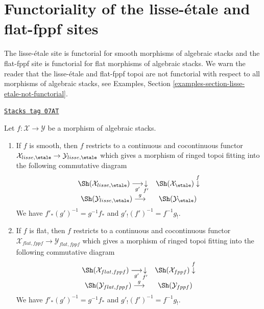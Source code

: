 \section{Functoriality of the lisse-\'etale and flat-fppf sites}
\label{stacks-cohomology-section-lisse-etale-functorial}
The lisse-\'etale site is functorial for smooth morphisms of algebraic stacks
and the flat-fppf site is functorial for flat morphisms of algebraic stacks.
We warn the reader that the lisse-\'etale and flat-fppf topoi are not
functorial with respect to all morphisms of algebraic stacks, see
Examples, Section \ref{examples-section-lisse-etale-not-functorial}.

\begin{lemma}
\label{stacks-cohomology-lemma-lisse-etale-functorial}
\href{https://stacks.math.columbia.edu/tag/07AT}{\texttt{Stacks tag 07AT}}

Let $f : \mathcal{X} \to \mathcal{Y}$ be a morphism of algebraic stacks.
\begin{enumerate}
\item If $f$ is smooth, then $f$ restricts to a continuous and cocontinuous
functor
$\mathcal{X}_{lisse,\etale} \to \mathcal{Y}_{lisse,\etale}$
which gives a morphism of ringed topoi fitting into the following
commutative diagram
$$
\begin{array}{cc}\Sh(\mathcal{X}_{lisse,\etale}) \underset{g'}{\longrightarrow}\underset{f'}{\downarrow} & \Sh(\mathcal{X}_\etale) \overset{f}{\downarrow} \\ \Sh(\mathcal{Y}_{lisse,\etale}) \overset{g}{\longrightarrow} & \Sh(\mathcal{Y}_\etale)\end{array}
$$
We have $f'_*(g')^{-1} = g^{-1}f_*$ and $g'_!(f')^{-1} = f^{-1}g_!$.
\item If $f$ is flat, then $f$ restricts to a continuous and cocontinuous
functor
$\mathcal{X}_{flat,fppf} \to \mathcal{Y}_{flat,fppf}$
which gives a morphism of ringed topoi fitting into the following
commutative diagram
$$
\begin{array}{cc}\Sh(\mathcal{X}_{flat,fppf}) \underset{g'}{\longrightarrow}\underset{f'}{\downarrow} & \Sh(\mathcal{X}_{fppf}) \overset{f}{\downarrow} \\ \Sh(\mathcal{Y}_{flat,fppf}) \overset{g}{\longrightarrow} & \Sh(\mathcal{Y}_{fppf})\end{array}
$$
We have $f'_*(g')^{-1} = g^{-1}f_*$ and $g'_!(f')^{-1} = f^{-1}g_!$.
\end{enumerate}
\end{lemma}

